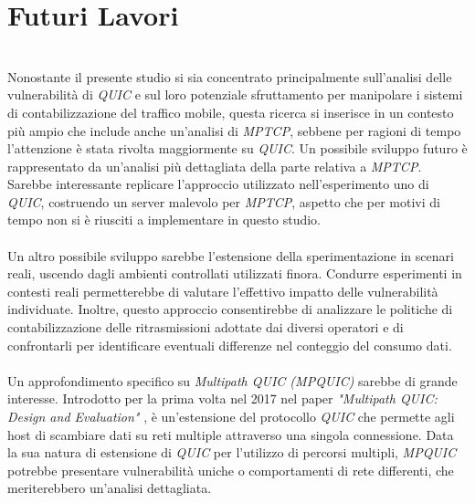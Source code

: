 \section{Futuri Lavori}
~\\
\indent Nonostante il presente studio si sia concentrato principalmente sull'analisi delle vulnerabilità di \emph{QUIC} e sul loro potenziale sfruttamento per manipolare i sistemi di contabilizzazione del traffico mobile, questa ricerca si inserisce in un contesto più ampio che include anche un'analisi di \emph{MPTCP}, 
sebbene per ragioni di tempo l'attenzione è stata rivolta maggiormente su \emph{QUIC}. Un possibile sviluppo futuro è rappresentato da un'analisi più dettagliata della parte relativa a \emph{MPTCP}.
Sarebbe interessante replicare l'approccio utilizzato nell'esperimento uno di \emph{QUIC}, costruendo un server malevolo per \emph{MPTCP}, aspetto che per motivi di tempo non si è riusciti a implementare in questo studio.
\\\\
Un altro possibile sviluppo sarebbe l'estensione della sperimentazione in scenari reali, uscendo dagli ambienti controllati utilizzati finora. 
Condurre esperimenti in contesti reali permetterebbe di valutare l'effettivo impatto delle vulnerabilità individuate. 
Inoltre, questo approccio consentirebbe di analizzare le politiche di contabilizzazione delle ritrasmissioni adottate dai diversi operatori 
e di confrontarli per identificare eventuali differenze nel conteggio del consumo dati.
\\\\
Un approfondimento specifico su \emph{Multipath QUIC (MPQUIC)} sarebbe di grande interesse. 
Introdotto per la prima volta nel 2017 nel paper \emph{"Multipath QUIC: Design and Evaluation"} \cite{article:mpquic},
è un'estensione del protocollo \emph{QUIC} che permette agli host di scambiare dati su reti multiple attraverso una singola connessione.
Data la sua natura di estensione di \emph{QUIC} per l'utilizzo di percorsi multipli,
\emph{MPQUIC} potrebbe presentare vulnerabilità uniche o comportamenti di rete differenti, che meriterebbero un'analisi dettagliata.
